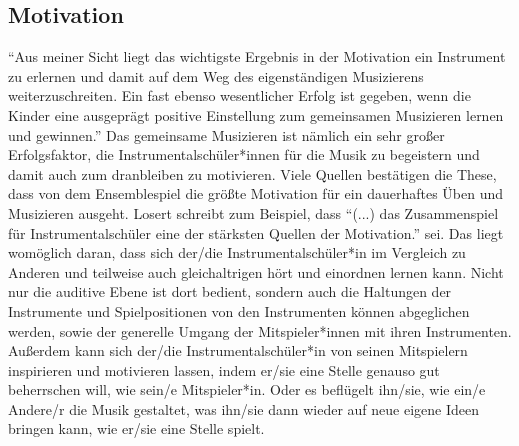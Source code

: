 \subsection{Motivation}

\enquote{Aus meiner Sicht liegt das wichtigste Ergebnis in der Motivation ein
Instrument zu erlernen und damit auf dem Weg des eigenständigen Musizierens
weiterzuschreiten. Ein fast ebenso wesentlicher Erfolg ist gegeben, wenn die
Kinder eine ausgeprägt positive Einstellung zum gemeinsamen Musizieren lernen
und gewinnen.}\autocite[40]{ernst:die_zukunftsfaehige_musikschule} Das
gemeinsame Musizieren ist nämlich ein sehr großer Erfolgsfaktor, die
Instrumentalschüler*innen für die Musik zu begeistern und damit auch zum
dranbleiben zu motivieren. Viele Quellen bestätigen die These, dass von dem
Ensemblespiel die größte Motivation für ein dauerhaftes Üben und Musizieren
ausgeht. Losert schreibt zum Beispiel, dass \enquote{(...) das Zusammenspiel für
Instrumentalschüler eine der stärksten Quellen der Motivation.} sei.
\autocite[92]{losert:die_kunst_zu_unterrichten} Das liegt womöglich daran, dass
sich der/die Instrumentalschüler*in im Vergleich zu Anderen und teilweise auch
gleichaltrigen hört und einordnen lernen kann. Nicht nur die auditive Ebene ist
dort bedient, sondern auch die Haltungen der Instrumente und Spielpositionen von
den Instrumenten können abgeglichen werden, sowie der generelle Umgang der
Mitspieler*innen mit ihren Instrumenten. Außerdem kann sich der/die
Instrumentalschüler*in von seinen Mitspielern inspirieren und motivieren lassen,
indem er/sie eine Stelle genauso gut beherrschen will, wie sein/e Mitspieler*in.
Oder es beflügelt ihn/sie, wie ein/e Andere/r die Musik gestaltet, was ihn/sie
dann wieder auf neue eigene Ideen bringen kann, wie er/sie eine Stelle spielt.

